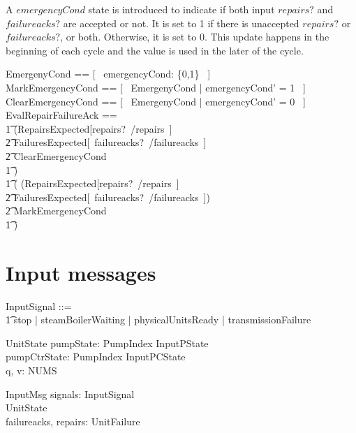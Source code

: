 \documentclass{report} %
\begin{document}
A $emergencyCond$ state is introduced to indicate if both input $repairs?$ and $failureacks?$ are accepted or not. It is set to 1 if there is unaccepted $repairs?$ or $failureacks?$, or both. Otherwise, it is set to 0. This update happens in the beginning of each cycle and the value is used in the later of the cycle.
\begin{zed}
    EmergenyCond == [~ emergencyCond: \{0,1\} ~] \\ %
    MarkEmergencyCond == [~ \Delta EmergenyCond | emergencyCond' = 1 ~] \\
    ClearEmergencyCond == [~ \Delta EmergenyCond | emergencyCond' = 0 ~] \\
    EvalRepairFailureAck == \\ 
        \t1 (RepairsExpected[repairs?~/repairs~] \land \\
            \t2 FailuresExpected[~failureacks?~/failureacks~] \land \\
            \t2 ClearEmergencyCond\\
        \t1 ) \lor \\
        \t1 ( (\lnot RepairsExpected[repairs?~/repairs~] \lor \\
            \t2 \lnot FailuresExpected[~failureacks?~/failureacks~]) \\
            \t2 \land MarkEmergencyCond \\
        \t1 )  \\
\end{zed}

\section{Input messages}

\begin{zed}
  InputSignal ::= \\
  \t1 stop | steamBoilerWaiting | physicalUnitsReady | transmissionFailure
\end{zed}

\begin{schema}{UnitState}
  pumpState: PumpIndex \fun InputPState \\ %
  pumpCtrState: PumpIndex \fun InputPCState \\ %
  q, v: NUMS
\end{schema}

\begin{schema}{InputMsg}
  signals: \power InputSignal \\ %
  UnitState \\ %
  failureacks, repairs: \power UnitFailure
\end{schema}
\end{document}
